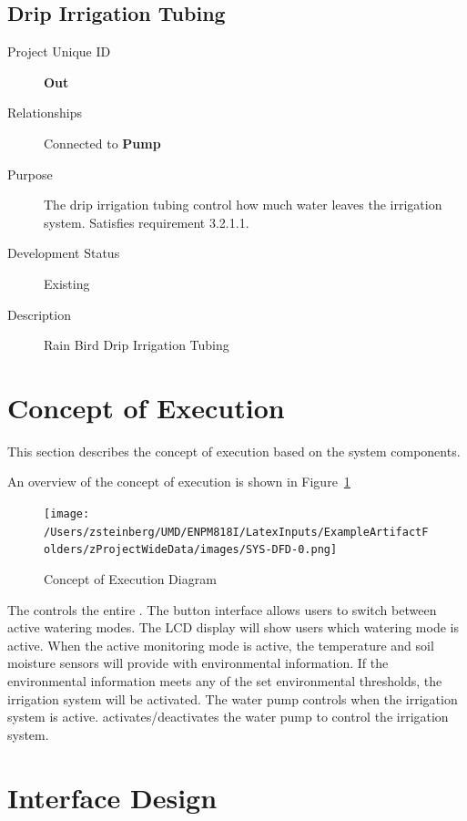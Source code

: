 \subsection{Drip Irrigation Tubing}

\begin{description}
    \item[Project Unique ID] \textbf{Out}
    \item[Relationships] Connected to \textbf{Pump}
    \item[Purpose] The drip irrigation tubing control how much water leaves the irrigation system. Satisfies requirement 3.2.1.1.
    \item[Development Status] Existing
    \item[Description] Rain Bird Drip Irrigation Tubing
\end{description}


\section{Concept of Execution}
\label{loc:ConceptOfEExecution}
% 

This section describes the concept of execution based on the system components.

An overview of the concept of execution is shown in Figure~\ref{fig:COE}

\begin{figure}[htbp]
	\centering
		\texttt{[image: /Users/zsteinberg/UMD/ENPM818I/LatexInputs/ExampleArtifactFolders/zProjectWideData/images/SYS-DFD-0.png]}
	\caption[Concept of Execution Overview]{Concept of Execution Diagram}
	\label{fig:COE}
\end{figure}

The \RaspPi controls the entire \ThisSystem. The button interface allows users to switch between \ThisSys active watering modes. The LCD display will show users which watering mode is active.
When the active monitoring mode is active, the temperature and soil moisture sensors will provide \ThisSys with environmental information. If the environmental information meets any of the set environmental thresholds,
the irrigation system will be activated. The water pump controls when the irrigation system is active. \ThisSys activates/deactivates the water pump to control the irrigation system.


\section{Interface Design}
\label{loc:InterfaceDesign}
% 

